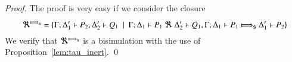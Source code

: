 \begin{proof}
	The proof is very easy if we consider the
	closure
	\[
		\Re^{\SHby{}} = \set{ \horel{\Gamma}{\Delta_1'}{P_2}{,}{\Delta_2'}{Q_1} \setbar \horel{\Gamma}{\Delta_1}{P_1}{\ \Re\ }{\Delta_2'}{Q_1},
		\horel{\Gamma}{\Delta_1}{P_1}{\SHby{}}{\Delta_1'}{P_2} }
	\]
	We verify that $\Re^{\SHby{}}$ is a bisimulation with
	the use of Proposition~\ref{lem:tau_inert}.
	\qed
\end{proof}
